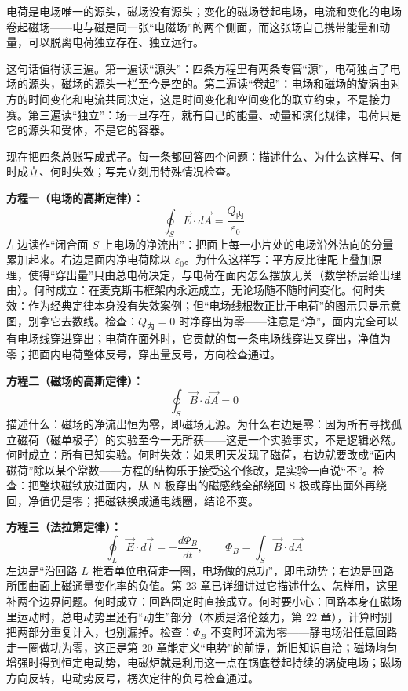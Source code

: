 \begin{oneline}
电荷是电场唯一的源头，磁场没有源头；变化的磁场卷起电场，电流和变化的电场卷起磁场——电与磁是同一张“电磁场”的两个侧面，而这张场自己携带能量和动量，可以脱离电荷独立存在、独立远行。
\end{oneline}

这句话值得读三遍。第一遍读“源头”：四条方程里有两条专管“源”，电荷独占了电场的源头，磁场的源头一栏至今是空的。第二遍读“卷起”：电场和磁场的旋涡由对方的时间变化和电流共同决定，这是时间变化和空间变化的联立约束，不是接力赛。第三遍读“独立”：场一旦存在，就有自己的能量、动量和演化规律，电荷只是它的源头和受体，不是它的容器。


现在把四条总账写成式子。每一条都回答四个问题：描述什么、为什么这样写、何时成立、何时失效；写完立刻用特殊情况检查。

\textbf{方程一（电场的高斯定律）：}
\[
\oint_S \vec E\cdot d\vec A=\frac{Q_{\text{内}}}{\varepsilon_0}
\]
左边读作“闭合面 \(S\) 上电场的净流出”：把面上每一小片处的电场沿外法向的分量累加起来。右边是面内净电荷除以 \(\varepsilon_0\)。为什么这样写：平方反比律配上叠加原理，使得“穿出量”只由总电荷决定，与电荷在面内怎么摆放无关（数学桥层给出理由）。何时成立：在麦克斯韦框架内永远成立，无论场随不随时间变化。何时失效：作为经典定律本身没有失效案例；但“电场线根数正比于电荷”的图示只是示意图，别拿它去数线。检查：\(Q_{\text{内}}=0\) 时净穿出为零——注意是“净”，面内完全可以有电场线穿进穿出；电荷在面外时，它贡献的每一条电场线穿进又穿出，净值为零；把面内电荷整体反号，穿出量反号，方向检查通过。

\textbf{方程二（磁场的高斯定律）：}
\[
\oint_S \vec B\cdot d\vec A=0
\]
描述什么：磁场的净流出恒为零，即磁场无源。为什么右边是零：因为所有寻找孤立磁荷（磁单极子）的实验至今一无所获——这是一个实验事实，不是逻辑必然。何时成立：所有已知实验。何时失效：如果明天发现了磁荷，右边就要改成“面内磁荷”除以某个常数——方程的结构乐于接受这个修改，是实验一直说“不”。检查：把整块磁铁放进面内，从 N 极穿出的磁感线全部绕回 S 极或穿出面外再绕回，净值仍是零；把磁铁换成通电线圈，结论不变。

\textbf{方程三（法拉第定律）：}
\[
\oint_L \vec E\cdot d\vec l=-\frac{d\varPhi_B}{dt},\qquad \varPhi_B=\int_S \vec B\cdot d\vec A
\]
左边是“沿回路 \(L\) 推着单位电荷走一圈，电场做的总功”，即电动势；右边是回路所围曲面上磁通量变化率的负值。第 23 章已详细讲过它描述什么、怎样用，这里补两个边界问题。何时成立：回路固定时直接成立。何时要小心：回路本身在磁场里运动时，总电动势里还有“动生”部分（本质是洛伦兹力，第 22 章），计算时别把两部分重复计入，也别漏掉。检查：\(\varPhi_B\) 不变时环流为零——静电场沿任意回路走一圈做功为零，这正是第 20 章能定义“电势”的前提，新旧知识自洽；磁场均匀增强时得到恒定电动势，电磁炉就是利用这一点在锅底卷起持续的涡旋电场；磁场方向反转，电动势反号，楞次定律的负号检查通过。

